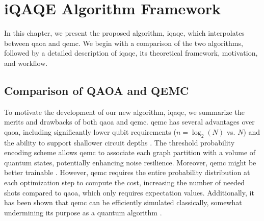 
\chapter{iQAQE Algorithm Framework}
\label{chapter:Base Algorithm}



In this chapter, we present the proposed algorithm, \acrshort{iqaqe}, which interpolates between \acrshort{qaoa} and \acrshort{qemc}. We begin with a comparison of the two algorithms, followed by a detailed description of \acrshort{iqaqe}, its theoretical framework, motivation, and workflow.

\section{Comparison of QAOA and QEMC}
To motivate the development of our new algorithm, \acrshort{iqaqe}, we summarize the merits and drawbacks of both \acrshort{qaoa} and \acrshort{qemc}. \acrshort{qemc} has several advantages over \acrshort{qaoa}, including significantly lower qubit requirements ($n = \log_2(N)$ vs. $N$) and the ability to support shallower circuit depths \cite{tenecohen2023variational}. The threshold probability encoding scheme allows \acrshort{qemc} to associate each graph partition with a volume of quantum states, potentially enhancing noise resilience. Moreover, \acrshort{qemc} might be better trainable \cite{tenecohen2023variational}. However, \acrshort{qemc} requires the entire probability distribution at each optimization step to compute the cost, increasing the number of needed shots compared to \acrshort{qaoa}, which only requires expectation values. Additionally, it has been shown that \acrshort{qemc} can be efficiently simulated classically, somewhat undermining its purpose as a quantum algorithm \cite{tenecohen2023variational}.

